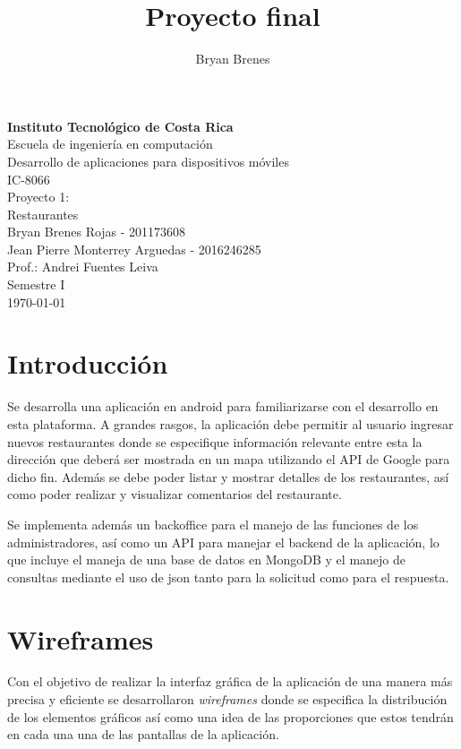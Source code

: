 \documentclass[12pt,letterpaper]{article}
\author{Bryan Brenes}
\title{Proyecto final}
\begin{document}
\begin{titlepage}
	\begin{center}
		{\large \textbf{Instituto Tecnológico de Costa Rica}} \\
		Escuela de ingeniería en computación \\
		Desarrollo de aplicaciones para dispositivos móviles\\
		IC-8066\\
		\vfill
		Proyecto 1: \\ Restaurantes\\
		\vfill
		Bryan Brenes Rojas - 201173608 \\
		Jean Pierre Monterrey Arguedas - 2016246285 \\
		Prof.: Andrei Fuentes Leiva\\
		\vfill
		Semestre I \\
		\today
	\end{center}
\end{titlepage}

\tableofcontents
\thispagestyle{empty}
\pagebreak

\section{Introducción}
Se desarrolla una aplicación en android para familiarizarse con el desarrollo en esta plataforma. A grandes rasgos, la aplicación debe permitir al usuario ingresar nuevos restaurantes donde se especifique información relevante entre esta la dirección que deberá ser mostrada en un mapa utilizando el API de Google para dicho fin. Además se debe poder listar y mostrar detalles de los restaurantes, así como poder realizar y visualizar comentarios del restaurante.

Se implementa además un backoffice para el manejo de las funciones de los administradores, así como un API para manejar el backend de la aplicación, lo que incluye el maneja de una base de datos en MongoDB y el manejo de consultas mediante el uso de json tanto para la solicitud como para el respuesta.


\section{Wireframes}
Con el objetivo de realizar la interfaz gráfica de la aplicación de una manera más precisa y eficiente se desarrollaron \textit{wireframes} donde se especifica la distribución de los elementos gráficos así como una idea de las proporciones que estos tendrán en cada una una de las pantallas de la aplicación.
\end{document}
